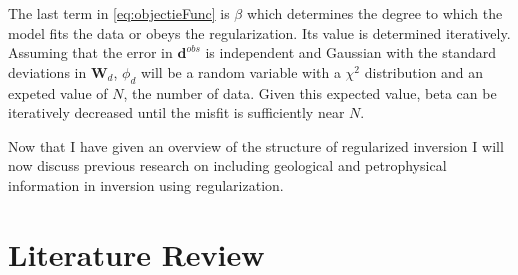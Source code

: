 The last term in \autoref{eq:objectieFunc} is $\beta$ which determines the degree to which the model fits the data or obeys the regularization. Its value is determined iteratively. Assuming that the error in $\mathbf d^{obs}$ is independent and Gaussian with the standard deviations in $\mathbf W_d$, $\phi_d$ will be a random variable with a $\chi^2$ distribution and an expeted value of $N$, the number of data. Given this expected value, beta can be iteratively decreased until the misfit is sufficiently near $N$.


Now that I have given an overview of the structure of regularized inversion I will now discuss previous research on including geological and petrophysical information in inversion using regularization.

\section{Literature Review}
\label{sec:Literature Review}

